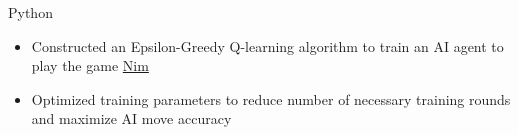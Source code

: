 \documentclass[letterpaper,11pt]{article}
\begin{document}
{Python}{}
\begin{itemize}[leftmargin=*]
    \item \vspace{-3pt} \small Constructed an Epsilon-Greedy Q-learning
          algorithm to train an AI agent to play the game
          \href{https://en.wikipedia.org/wiki/Nim}{Nim}
    \item \vspace{-7pt} \small Optimized training parameters to reduce number
          of necessary training rounds and maximize AI move accuracy
\end{itemize}



%
\end{document}
